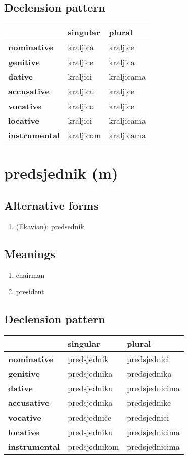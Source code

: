 \subsection*{Declension pattern}
\begin{tabularx}{\linewidth}{Xll}
\toprule
{} &   singular &      plural \\
\midrule
\textbf{nominative  } &   kraljica &    kraljice \\
\textbf{genitive    } &   kraljice &    kraljica \\
\textbf{dative      } &   kraljici &  kraljicama \\
\textbf{accusative  } &   kraljicu &    kraljice \\
\textbf{vocative    } &   kraljico &    kraljice \\
\textbf{locative    } &   kraljici &  kraljicama \\
\textbf{instrumental} &  kraljicom &  kraljicama \\
\bottomrule
\end{tabularx}

\filbreak
\section{predsjednik (m)}
\subsection*{Alternative forms}
\begin{enumerate}
\item (Ekavian): predsednik
\end{enumerate}
\subsection*{Meanings}
\begin{enumerate}
\item chairman
\item president
\end{enumerate}
\subsection*{Declension pattern}
\begin{tabularx}{\linewidth}{Xll}
\toprule
{} &       singular &          plural \\
\midrule
\textbf{nominative  } &    predsjednik &    predsjednici \\
\textbf{genitive    } &   predsjednika &    predsjednika \\
\textbf{dative      } &   predsjedniku &  predsjednicima \\
\textbf{accusative  } &   predsjednika &    predsjednike \\
\textbf{vocative    } &   predsjedniče &    predsjednici \\
\textbf{locative    } &   predsjedniku &  predsjednicima \\
\textbf{instrumental} &  predsjednikom &  predsjednicima \\
\bottomrule
\end{tabularx}

